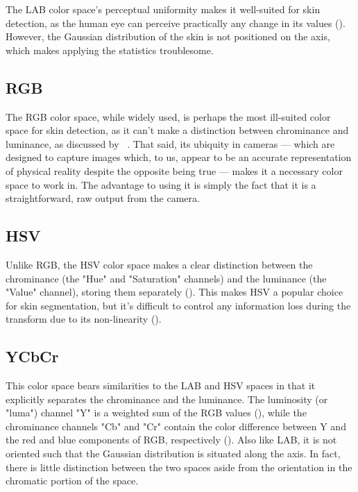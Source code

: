 The LAB color space's perceptual uniformity makes it well-suited for skin detection, as the human eye can perceive practically any change in its values (\cite{Vezhnevets2003,Poynton1997}). However, the Gaussian distribution of the skin is not positioned on the axis, which makes applying the statistics troublesome.

\subsection{RGB}\label{sec:RGB}

The RGB color space, while widely used, is perhaps the most ill-suited color space for skin detection, as it can't make a distinction between chrominance and luminance, as discussed by ~\cite{Vezhnevets2003,Brand2000a}. That said, its ubiquity in cameras --- which are designed to capture images which, to us, appear to be an accurate representation of physical reality despite the opposite being true --- makes it a necessary color space to work in. The advantage to using it is simply the fact that it is a straightforward, raw output from the camera.

\subsection{HSV}\label{sec:HSV}

Unlike RGB, the HSV color space makes a clear distinction between the chrominance (the "Hue" and "Saturation" channels) and the luminance (the "Value" channel), storing them separately (\cite{Vezhnevets2003,Sigal2000a}). This makes HSV a popular choice for skin segmentation, but it's difficult to control any information loss during the transform due to its non-linearity (\cite{Poynton1997}).

\subsection{YCbCr}\label{sec:YCbCr}

This color space bears similarities to the LAB and HSV spaces in that it explicitly separates the chrominance and the luminance. The luminosity (or "luma") channel "Y" is a weighted sum of the RGB values (\cite{Poynton1997,Phung2002a}), while the chrominance channels "Cb" and "Cr" contain the color difference between Y and the red and blue components of RGB, respectively (\cite{Vezhnevets2003}). Also like LAB, it is not oriented such that the Gaussian distribution is situated along the axis. In fact, there is little distinction between the two spaces aside from the orientation in the chromatic portion of the space.

